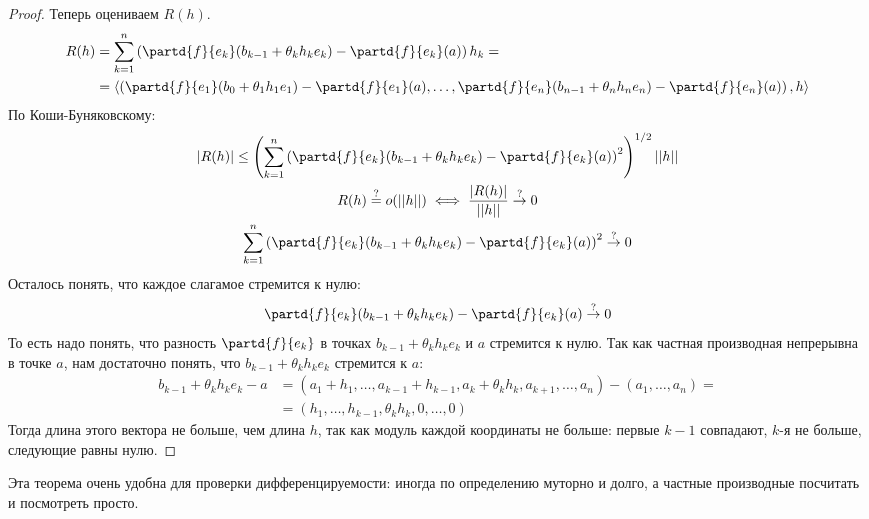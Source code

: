 \begin{proof}
	Теперь оцениваем $R(h)$.
	\begin{align*}
	R(h) &= \sum_{k=1}^n \left( \partd{f}{e_k} (b_{k-1}+\theta_k h_k e_k) - \partd{f}{e_k}(a) \right)h_k = \\
			 &= \left<\left(\partd{f}{e_1}(b_0+\theta_1 h_1 e_1) - \partd{f}{e_1}(a), \dots, \partd{f}{e_n}(b_{n-1}+\theta_n h_n e_n) - \partd{f}{e_n}(a) \right), h\right>
	\end{align*}
	По Коши-Буняковскому:
	\begin{gather*}
	|R(h)| \le \left( \sum_{k=1}^n \left( \partd{f}{e_k} (b_{k-1}+\theta_k h_k e_k) - \partd{f}{e_k}(a) \right)^2 \right)^{1/2} ||h|| \\
	R(h) \stackrel?= o(||h||) \iff \frac{|R(h)|}{||h||} \stackrel{?}{\to} 0 \\
	\sum_{k=1}^n \left( \partd{f}{e_k} (b_{k-1}+\theta_k h_k e_k) - \partd{f}{e_k}(a) \right)^2 \stackrel{?}{\to} 0
	\end{gather*}
	Осталось понять, что каждое слагамое стремится к нулю:
	\[
	\partd{f}{e_k} (b_{k-1}+\theta_k h_k e_k) - \partd{f}{e_k}(a) \stackrel{?}{\to} 0
	\]
	То есть надо понять, что разность $\partd{f}{e_k}$ в точках $b_{k-1}+\theta_k h_k e_k$ и $a$ стремится к нулю.
	Так как частная производная непрерывна в точке $a$, нам достаточно понять, что $b_{k-1}+\theta_k h_k e_k$ стремится к $a$:
	\begin{align*}
	b_{k-1}+\theta_k h_k e_k - a &= (a_1+h_1, \dots, a_{k-1}+h_{k-1}, a_k + \theta_k h_k, a_{k+1}, \dots, a_n) - (a_1, \dots, a_n) = \\
	                         &= (h_1, \dots, h_{k-1}, \theta_k h_k, 0, \dots, 0)
	\end{align*}
	Тогда длина этого вектора не больше, чем длина $h$, так как модуль каждой координаты не больше:
	первые $k-1$ совпадают, $k$-я не больше, следующие равны нулю.

\end{proof}
\begin{Rem}
	Эта теорема очень удобна для проверки дифференцируемости: иногда по определению муторно и долго, а частные производные посчитать и посмотреть просто.
\end{Rem}

